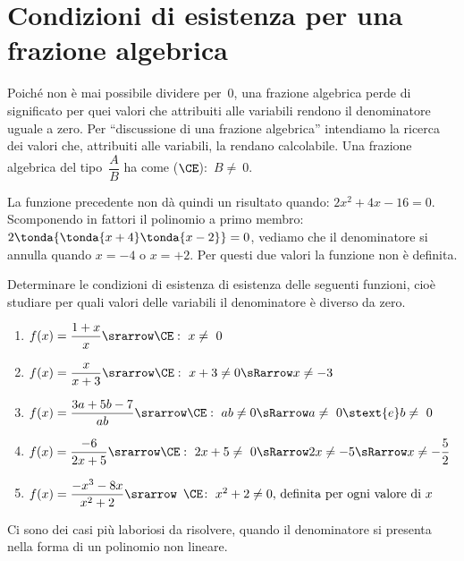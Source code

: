 \section{Condizioni di esistenza per una frazione algebrica}
\label{sec:frazalg_condizioniesistenza}

Poiché non è mai possibile dividere per~\(0\), una frazione algebrica perde 
di significato per quei valori che attribuiti alle variabili rendono il 
denominatore uguale a zero. 
Per ``discussione di una frazione algebrica'' intendiamo la ricerca dei 
valori che, attribuiti alle variabili, la rendano calcolabile. 
Una frazione algebrica del tipo~\(\dfrac{A}{B}\) ha come 
 (\(\CE\)):~\(B\neq~0\).

La funzione precedente non dà quindi un risultato quando: \(2x^2 +4x -16=0\).
Scomponendo in fattori il polinomio a primo membro: 
\(2 \tonda{\tonda{x+4}\tonda{x-2}}=0\),
vediamo che il denominatore si annulla quando \(x=-4\) o \(x=+2\).
Per questi due valori la funzione non è definita.
\begin{esempio}{}{}
Determinare le condizioni di esistenza di esistenza delle seguenti funzioni, 
cioè studiare per quali valori delle variabili il denominatore è diverso da 
zero.

\begin{enumerate} [left=0mm]
\item \(f(x)=\dfrac{1+x}{x} \srarrow \CE:~ x\neq~0\)
\item \(f(x)=\dfrac{x}{x+3} \srarrow \CE:~ x+3 \neq 0 \sRarrow x \neq -3\)
\item \(f(x)=\dfrac{3a+5b-7}{ab} \srarrow 
\CE:~ ab \neq 0 \sRarrow a\neq~0 \stext{e} b\neq~0\)
\item \(f(x)=\dfrac{-6}{2x+5} \srarrow 
\CE:~ 2x+5\neq~0 \sRarrow 2x \neq -5 \sRarrow x\neq -\dfrac{5}{2}\)
\item \(f(x)=\dfrac{-x^{3}-8x}{x^{2}+2} \srarrow 
\begin{array}{l}\CE\!:~ x^{2}+2 \neq 0 
\text{, definita per ogni valore di } x
\end{array}\)
\end{enumerate}
\end{esempio}

Ci sono dei casi più laboriosi da risolvere, quando il denominatore si 
presenta nella forma di un polinomio non lineare.

